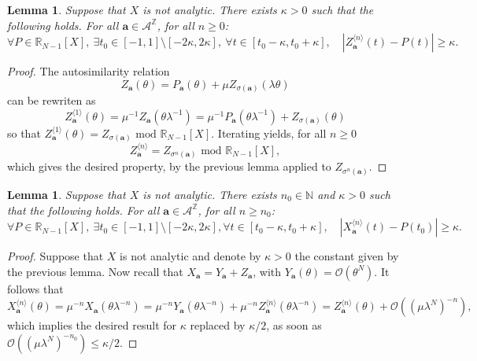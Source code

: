 \documentclass[11pt]{amsart}
\theoremstyle{plain}
\newtheorem{lemma}[theorem]{Lemma}
\theoremstyle{definition}
\numberwithin{equation}{section}
\begin{document}
\begin{lemma}
Suppose that $X$ is not analytic. There exists $\kappa >0$ such that the following holds. For all $\mathbf{a} \in \mathcal{A}^\mathbb{Z}$, for all $n \geq 0$:
$$ \forall P \in \mathbb{R}_{N-1}[X], \ \exists t_0 \in [-1,1] \setminus [-2\kappa,2\kappa], \ \forall t \in [t_0-\kappa,t_0+\kappa], \quad |Z_\mathbf{a}^{\langle n \rangle}(t)-P(t)| \geq \kappa. $$
\end{lemma}

\begin{proof}
The autosimilarity relation
$$ Z_\mathbf{a}(\theta) = P_\mathbf{a}(\theta)+ \mu Z_{\sigma(\mathbf{a})}(\lambda \theta) $$
can be rewriten as $$ Z_\mathbf{a}^{\langle 1 \rangle}(\theta) = \mu^{-1} Z_{\mathbf{a}}(\theta \lambda^{-1}) = \mu^{-1} P_\mathbf{a}(\theta \lambda^{-1})+ Z_{\sigma(\mathbf{a})}(\theta) $$
so that $ Z_\mathbf{a}^{\langle 1 \rangle}(\theta) = Z_{\sigma(\mathbf{a})} \text{ mod } \mathbb{R}_{N-1}[X]. $
Iterating yields, for all $n \geq 0$
$$ Z_\mathbf{a}^{\langle n \rangle} = Z_{\sigma^{n}(\mathbf{a})} \text{ mod } \mathbb{R}_{N-1}[X] ,$$
which gives the desired property, by the previous lemma applied to $Z_{\sigma^{n}(\mathbf{a})}$.
\end{proof}


\begin{lemma}\label{lem:osc}
Suppose that $X$ is not analytic. There exists $n_0 \in \mathbb{N}$ and $\kappa >0$ such that the following holds. For all $\mathbf{a} \in \mathcal{A}^\mathbb{Z}$, for all $n \geq n_0$:
$$ \forall P \in \mathbb{R}_{N-1}[X], \ \exists t_0 \in [-1,1] \setminus [-2\kappa,2\kappa], \forall t \in [t_0-\kappa,t_0+\kappa], \quad |X_\mathbf{a}^{\langle n \rangle}(t)-P(t_0)| \geq \kappa. $$
\end{lemma}


\begin{proof}
Suppose that $X$ is not analytic and denote by $\kappa>0$ the constant given by the previous lemma. Now recall that $X_\mathbf{a}=Y_\mathbf{a}+Z_\mathbf{a}$, with $Y_\mathbf{a}(\theta)=\mathcal{O}(\theta^N)$. It follows that
$$ X_\mathbf{a}^{\langle n \rangle}(\theta) = \mu^{-n} X_\mathbf{a}(\theta \lambda^{-n}) = \mu^{-n} Y_\mathbf{a}(\theta \lambda^{-n}) + \mu^{-n} Z_\mathbf{a}^{\langle n \rangle}(\theta \lambda^{-n}) = Z_\mathbf{a}^{\langle n \rangle}(\theta) + \mathcal{O}( (\mu \lambda^N)^{-n} ), $$
which implies the desired result for $\kappa$ replaced by $\kappa/2$, as soon as $\mathcal{O}((\mu \lambda^N)^{-n_0}) \leq \kappa/2$.
\end{proof}
\end{document}

